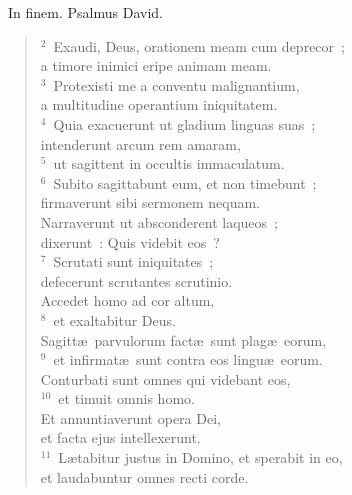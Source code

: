 ~\lettrine[lines=10,image=true,loversize=0.05,lraise=-0.03]{I}{}n finem. Psalmus David.
\begin{flushleft}\begin{verse}\vspace{6pt}${}^{2}$~Exaudi, Deus, orationem meam cum deprecor~;\\ a timore inimici eripe animam meam.\\
${}^{3}$~Protexisti me a conventu malignantium,\\ a multitudine operantium iniquitatem.\\
${}^{4}$~Quia exacuerunt ut gladium linguas suas~;\\ intenderunt arcum rem amaram,\\
${}^{5}$~ut sagittent in occultis immaculatum.\\
${}^{6}$~Subito sagittabunt eum, et non timebunt~;\\ firmaverunt sibi sermonem nequam.\\ Narraverunt ut absconderent laqueos~;\\ dixerunt~: Quis videbit eos~?\\
${}^{7}$~Scrutati sunt iniquitates~;\\ defecerunt scrutantes scrutinio.\\ Accedet homo ad cor altum,\\
${}^{8}$~et exaltabitur Deus.\\ Sagitt\ae\ parvulorum fact\ae\ sunt plag\ae\ eorum,\\
${}^{9}$~et infirmat\ae\ sunt contra eos lingu\ae\ eorum.\\ Conturbati sunt omnes qui videbant eos,\\
${}^{10}$~et timuit omnis homo.\\ Et annuntiaverunt opera Dei,\\ et facta ejus intellexerunt.\\
${}^{11}$~L\ae tabitur justus in Domino, et sperabit in eo,\\ et laudabuntur omnes recti corde.\end{verse}\end{flushleft}


